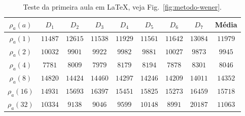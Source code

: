 \begin{table}[h!]
\renewcommand{\arraystretch}{1.3}
\caption{Teste da primeira aula em \LaTeX, veja Fig.~\ref{fig:metodo-wener}.}
\centering
\begin{tabular}{c|||c|||c||c||c||c||c||c||c}\hline
\bfseries $\rho_a(a)$ & \bfseries $D_1$ & \bfseries $D_2$ & \bfseries $D_3$ & \bfseries $D_4$ & \bfseries $D_5$ & \bfseries $D_6$ & \bfseries $D_7$ & \bfseries Média \\\hline\hline
$\rho_a(1)$  & $11487$ & $12615$ & $11538$ & $11929$ & $11561$ & $11642$ & $13084$ & $11979$\\
$\rho_a(2)$  & $10032$ & $9901$  & $9922$  & $9982$  & $9881$  & $10027$ & $9873$  & $9945$ \\\hline
$\rho_a(4)$  & $7781$  & $8009$  & $7979$  & $8179$  & $8194$  & $7878$  & $8301$  & $8046$ \\
$\rho_a(8)$  & $14820$ & $14424$ & $14460$ & $14297$ & $14246$ & $14209$ & $14011$ & $14352$\\\hline\hline
$\rho_a(16)$ & $14931$ & $15693$ & $16397$ & $15451$ & $15825$ & $15273$ & $16459$ & $15718$\\
$\rho_a(32)$ & $10334$ & $9138$  & $9046$  & $9599$  & $10148$ & $8991$  & $20187$ & $11063$\\\hline
\end{tabular}
\label{tab41new}
\end{table}




